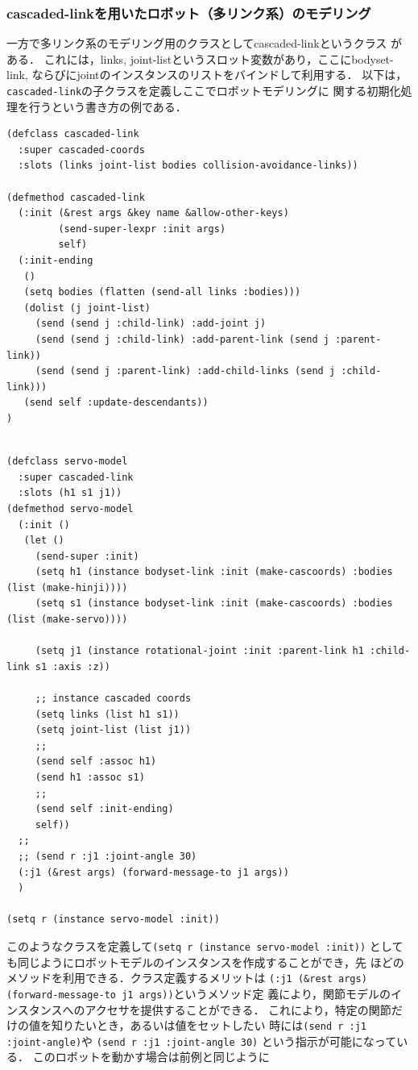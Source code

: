 \subsubsection{cascaded-linkを用いたロボット（多リンク系）のモデリング}

一方で多リンク系のモデリング用のクラスとしてcascaded-linkというクラス
がある．
これには，links, joint-listというスロット変数があり，ここにbodyset-link,
ならびにjointのインスタンスのリストをバインドして利用する．
以下は，
\verb|cascaded-link|の子クラスを定義しここでロボットモデリングに
関する初期化処理を行うという書き方の例である．


{\baselineskip=10pt
\begin{verbatim}
(defclass cascaded-link
  :super cascaded-coords
  :slots (links joint-list bodies collision-avoidance-links))

(defmethod cascaded-link
  (:init (&rest args &key name &allow-other-keys)
         (send-super-lexpr :init args)
         self)
  (:init-ending
   ()
   (setq bodies (flatten (send-all links :bodies)))
   (dolist (j joint-list)
     (send (send j :child-link) :add-joint j)
     (send (send j :child-link) :add-parent-link (send j :parent-link))
     (send (send j :parent-link) :add-child-links (send j :child-link)))
   (send self :update-descendants))
)
\end{verbatim}
}

{\baselineskip=10pt
\begin{verbatim}

(defclass servo-model
  :super cascaded-link
  :slots (h1 s1 j1))
(defmethod servo-model
  (:init ()
   (let ()
     (send-super :init)
     (setq h1 (instance bodyset-link :init (make-cascoords) :bodies (list (make-hinji))))
     (setq s1 (instance bodyset-link :init (make-cascoords) :bodies (list (make-servo))))

     (setq j1 (instance rotational-joint :init :parent-link h1 :child-link s1 :axis :z))

     ;; instance cascaded coords
     (setq links (list h1 s1))
     (setq joint-list (list j1))
     ;;
     (send self :assoc h1)
     (send h1 :assoc s1)
     ;;
     (send self :init-ending)
     self))
  ;;
  ;; (send r :j1 :joint-angle 30)
  (:j1 (&rest args) (forward-message-to j1 args))
  )

(setq r (instance servo-model :init))
\end{verbatim}
}

このようなクラスを定義して\verb|(setq r (instance servo-model :init))|
としても同じようにロボットモデルのインスタンスを作成することができ，先
ほどのメソッドを利用できる．クラス定義するメリットは
\verb|(:j1 (&rest args) (forward-message-to j1 args))|というメソッド定
義により，関節モデルのインスタンスへのアクセサを提供することができる．
これにより，特定の関節だけの値を知りたいとき，あるいは値をセットしたい
時には\verb|(send r :j1 :joint-angle)|や
\verb|(send r :j1 :joint-angle 30)|
という指示が可能になっている．
このロボットを動かす場合は前例と同じように

